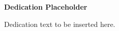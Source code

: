 \cleardoublepage
\thispagestyle{empty}
\null
\vfill
\begin{center}
{\Large\bfseries Dedication Placeholder}

\vspace{1em}
Dedication text to be inserted here.
\end{center}
\vfill
\null
